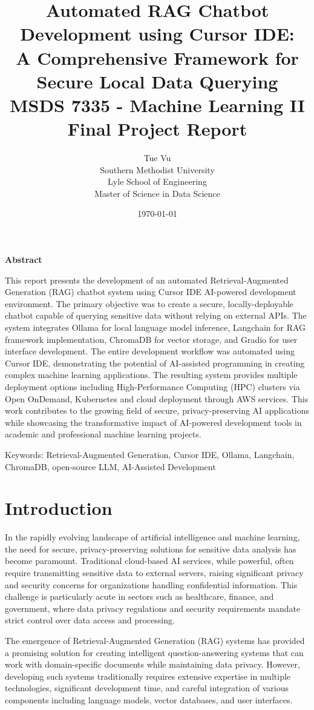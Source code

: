 \documentclass[12pt,letterpaper]{article}
\title{
    \vspace{2in}
    \textbf{\Large Automated RAG Chatbot Development using Cursor IDE: \\
    A Comprehensive Framework for Secure Local Data Querying} \\
    \vspace{0.5in}
    \large MSDS 7335 - Machine Learning II \\
    Final Project Report \\
    \vspace{0.5in}
}
\author{
    Tue Vu \\
    Southern Methodist University \\
    Lyle School of Engineering \\
    Master of Science in Data Science \\
    \vspace{0.25in}
}
\date{\today}
\begin{document}
\maketitle
\newpage

\textbf{Abstract}

This report presents the development of an automated Retrieval-Augmented Generation (RAG) chatbot system using Cursor IDE AI-powered development environment. The primary objective was to create a secure, locally-deployable chatbot capable of querying sensitive data without relying on external APIs. The system integrates Ollama for local language model inference, Langchain for RAG framework implementation, ChromaDB for vector storage, and Gradio for user interface development. The entire development workflow was automated using Cursor IDE, demonstrating the potential of AI-assisted programming in creating complex machine learning applications. The resulting system provides multiple deployment options including High-Performance Computing (HPC) clusters via Open OnDemand, Kubernetes and cloud deployment through AWS services.
This work contributes to the growing field of secure, privacy-preserving AI applications while showcasing the transformative impact of AI-powered development tools in academic and professional machine learning projects.

Keywords: Retrieval-Augmented Generation, Cursor IDE, Ollama, Langchain, ChromaDB, open-source LLM, AI-Assisted Development

\newpage

\section{Introduction}

In the rapidly evolving landscape of artificial intelligence and machine learning, the need for secure, privacy-preserving solutions for sensitive data analysis has become paramount. Traditional cloud-based AI services, while powerful, often require transmitting sensitive data to external servers, raising significant privacy and security concerns for organizations handling confidential information. This challenge is particularly acute in sectors such as healthcare, finance, and government, where data privacy regulations and security requirements mandate strict control over data access and processing.

The emergence of Retrieval-Augmented Generation (RAG) systems has provided a promising solution for creating intelligent question-answering systems that can work with domain-specific documents while maintaining data privacy. However, developing such systems traditionally requires extensive expertise in multiple technologies, significant development time, and careful integration of various components including language models, vector databases, and user interfaces.
\end{document}
